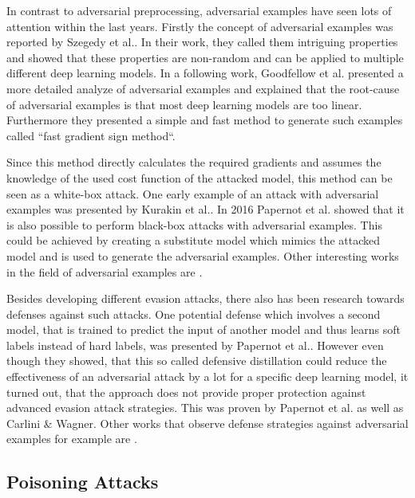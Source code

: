\documentclass[sigconf]{acmart}
\begin{document}
In contrast to adversarial preprocessing, adversarial examples have seen lots of attention within the last years.
Firstly the concept of adversarial examples was reported by Szegedy et al.\cite{intr}.
In their work, they called them intriguing properties and showed that these properties are non-random and can be applied to multiple different deep learning models.
In a following work, Goodfellow et al.\cite{43405} presented a more detailed analyze of adversarial examples and explained that the root-cause of adversarial examples is that most deep learning models are too linear.
Furthermore they presented a simple and fast method to generate such examples called ``fast gradient sign method``.

Since this method directly calculates the required gradients and assumes the knowledge of the used cost function of the attacked model, this method can be seen as a white-box attack.
One early example of an attack with adversarial examples was presented by Kurakin et al.\cite{advexinphys}.
In 2016 Papernot et al.\cite{Papernot2017PracticalBA} showed that it is also possible to perform black-box attacks with adversarial examples.
This could be achieved by creating a substitute model which mimics the attacked model and is used to generate the adversarial examples.
Other interesting works in the field of adversarial examples are \cite{8578273, brown2018adversarial, 10.1007/978-3-642-40994-3_25}.

Besides developing different evasion attacks, there also has been research towards defenses against such attacks.
One potential defense which involves a second model, that is trained to predict the input of another model and thus learns soft labels instead of hard labels, was presented by Papernot et al.\cite{7546524}.
However even though they showed, that this so called defensive distillation could reduce the effectiveness of an adversarial attack by a lot for a specific deep learning model, it turned out, that the approach does not provide proper protection against advanced evasion attack strategies.
This was proven by Papernot et al.\cite{Papernot2017PracticalBA} as well as Carlini \& Wagner\cite{7958570}.
Other works that observe defense strategies against adversarial examples for example are \cite{8835364, madry2019deep}.

\subsection{Poisoning Attacks}
\label{sec:poison}
\end{document}
